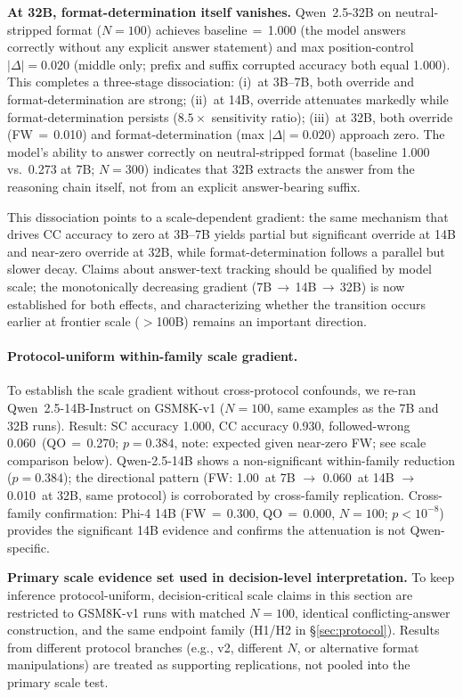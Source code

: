 \documentclass{article}
\theoremstyle{definition}
\theoremstyle{definition}
\newcommand{\SBCCFW}{1.00}
\newcommand{\PHIFOURCCFW}{0.300}
\newcommand{\PHIFOURQOACC}{0.000}
\newcommand{\PHIFOURCCPVAL}{$p{<}10^{-8}$}
\newcommand{\PHIFOURN}{100}
\newcommand{\QWTBCCFW}{0.010}
\newcommand{\QBVONESCACC}{1.000}
\newcommand{\QBVONECCACC}{0.930}
\newcommand{\QBVONEFW}{0.060}
\newcommand{\QBVONEQOACC}{0.270}
\newcommand{\QBVONEN}{100}
\newcommand{\QBVONEPVAL}{$p{=}0.384$}
\begin{document}
\textbf{At 32B, format-determination itself vanishes.}
Qwen~2.5-32B on neutral-stripped format ($N{=}100$) achieves baseline$\,=\,$1.000
(the model answers correctly without any explicit answer statement) and
max position-control $|\Delta|{=}0.020$ (middle only; prefix and suffix
corrupted accuracy both equal 1.000). This completes a
three-stage dissociation: (i)~at 3B--7B, both override and format-determination
are strong; (ii)~at 14B, override attenuates markedly while format-determination
persists ($8.5\times$ sensitivity ratio); (iii)~at 32B, both override
(FW$\,=$\,\QWTBCCFW) and format-determination (max $|\Delta|{=}0.020$)
approach zero. The model's ability to answer correctly on
neutral-stripped format (baseline 1.000 vs.\ 0.273 at 7B; $N{=}300$) indicates that
32B extracts the answer from the reasoning chain itself, not from
an explicit answer-bearing suffix.

This dissociation points to a scale-dependent
gradient: the same mechanism that drives CC accuracy to zero at 3B--7B
yields partial but significant override at 14B and near-zero override at 32B,
while format-determination follows a parallel but slower decay.
Claims about answer-text tracking should be qualified by model scale;
the monotonically decreasing gradient (7B\,$\to$\,14B\,$\to$\,32B) is now
established for both effects, and characterizing whether
the transition occurs earlier at frontier scale ($>$100B)
remains an important direction.

\paragraph{Protocol-uniform within-family scale gradient.}
To establish the scale gradient without cross-protocol confounds,
we re-ran Qwen~2.5-14B-Instruct on GSM8K-v1 ($N{=}\QBVONEN$,
same examples as the 7B and 32B runs).
Result: SC accuracy \QBVONESCACC, CC accuracy \QBVONECCACC,
followed-wrong \QBVONEFW\ (QO\,$=$\,\QBVONEQOACC; \QBVONEPVAL, note:
expected given near-zero FW; see scale comparison below).
Qwen-2.5-14B shows a non-significant within-family reduction (\QBVONEPVAL);
the directional pattern (FW: \SBCCFW\ at 7B $\to$ \QBVONEFW\ at 14B
$\to$ \QWTBCCFW\ at 32B, same protocol) is corroborated by cross-family
replication.
Cross-family confirmation: Phi-4 14B (FW\,$=$\,\PHIFOURCCFW,
QO\,$=$\,\PHIFOURQOACC, $N{=}\PHIFOURN$; \PHIFOURCCPVAL) provides the
significant 14B evidence and confirms the attenuation is not Qwen-specific.

\textbf{Primary scale evidence set used in decision-level interpretation.}
To keep inference protocol-uniform, decision-critical scale claims in this
section are restricted to GSM8K-v1 runs with matched $N{=}100$, identical
conflicting-answer construction, and the same endpoint family (H1/H2 in
\S\ref{sec:protocol}). Results from different protocol branches (e.g., v2,
different $N$, or alternative format manipulations) are treated as supporting
replications, not pooled into the primary scale test.
\end{document}
